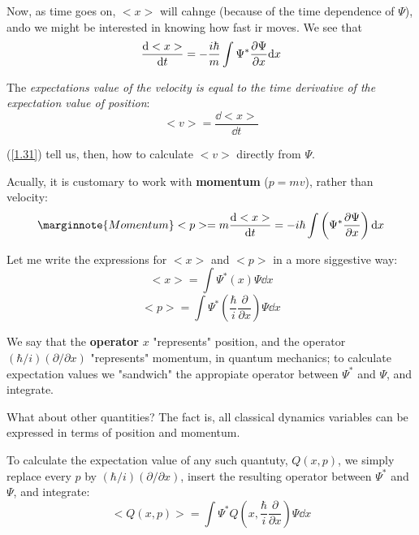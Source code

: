Now, as time goes on, $<x>$ will cahnge (because of the time dependence of $\Psi$), ando we might be interested in knowing how fast ir moves. We see that
\begin{equation}\label{1.31}
	\frac{\dd <x>}{\dd t}=-\frac{i\hbar}{m}\int\Psi^ *\pdv{\Psi}{x}\dd x
\end{equation}

The \textit{expectations value of the velocity is equal to the time derivative of the expectation value of position}:
\begin{equation}\label{1.32}
	<v>=\frac{\dd <x>}{\dd t}
\end{equation}

(\ref{1.31}) tell us, then, how to calculate $<v>$ directly from $\Psi$.

Acually, it is customary to work with \textbf{momentum} ($p=mv$), rather than velocity:
\begin{equation}\label{1.33}\marginnote{Momentum}
	<p>=m\frac{\dd <x>}{\dd t}=-i\hbar\int\left(\Psi^*\pdv{\Psi}{x}\right)\dd x
\end{equation}

Let me write the expressions for $<x>$ and $<p>$ in a more siggestive way:
\begin{equation}\label{1.34}
	<x>=\int\Psi^*(x)\Psi \dd x
\end{equation}
\begin{equation}\label{1.35}
	<p>=\int\Psi^*\left(\frac{\hbar}{i}\frac{\partial}{\partial x}\right)\Psi \dd x
\end{equation}

We say that the \textbf{operator} $x$ "represents" position, and the operator $(\hbar/i)(\partial/\partial x)$ "represents" momentum, in quantum mechanics; to calculate expectation values we "sandwich" the appropiate operator between $\Psi^*$ and $\Psi$, and integrate.

What about other quantities? The fact is, all classical dynamics variables can be expressed in terms of position and momentum.

To calculate the expectation value of any such quantuty, $Q(x,p)$, we simply replace every $p$ by $(\hbar/i)(\partial/\partial x)$, insert the resulting operator between $\Psi^*$ and $\Psi$, and integrate:
\begin{equation}\label{1.36}
	\boxed{<Q(x,p)>=\int\Psi^*Q\left(x,\frac{\hbar}{i}\frac{\partial}{\partial x}\right)\Psi\dd x}
\end{equation}

